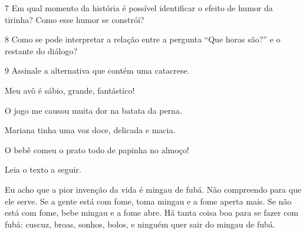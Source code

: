 \num{7} Em qual momento da história é possível identificar o efeito de
humor da tirinha? Como esse humor se constrói?


\num{8} Como se pode interpretar a relação entre a pergunta ``Que horas
são?'' e o restante do diálogo?


\num{9} Assinale a alternativa que contém uma catacrese.

\begin{escolha}
\item Meu avô é sábio, grande, fantástico!
\item O jogo me causou muita dor na batata da perna. 
\item Mariana tinha uma voz doce, delicada e macia.
\item O bebê comeu o prato todo de papinha no almoço!
\end{escolha}


\pagebreak
Leia o texto a seguir.

\begin{myquote}
Eu acho que a pior invenção da vida é mingau de fubá. Não compreendo
para que ele serve. Se a gente está com fome, toma mingau e a fome
aperta mais. Se não está com fome, bebe mingau e a fome abre. Há tanta
coisa boa para se fazer com fubá: cuscuz, broas, sonhos, bolos, e
ninguém quer sair do mingau de fubá.

\end{myquote}

